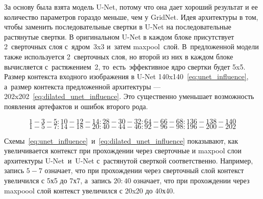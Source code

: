За основу была взята модель U-Net, потому что она дает хороший результат и ее количество параметров гораздо меньше, чем у GridNet. Идея архитектуры в том, чтобы заменить последовательные свертки в U-Net на последовательные растянутые свертки. В оригинальном U-Net в каждом блоке присутствует 2~сверточных слоя с~ядром~3x3 и~затем maxpool~слой. В~предложенной модели также используется 2~сверточных слоя, но второй из них в каждом блоке вычисляется с~растяжением~2, то~есть~эффективное ядро свертки будет 5x5. Размер контекста входного изображения в U-Net 140x140~\eqref{eq:unet_influence}, а~размер контекста предложенной архитектуры — 202x202~\eqref{eq:dilated_unet_influence}. Это существенно уменьшает возможность появления артефактов и ошибок второго рода.

\begin{equation} 
\label{eq:unet_influence}
1-3-5:10-12-14:28-30-32:64-66-68:136-138-140
\end{equation}
\begin{equation} 
\label{eq:dilated_unet_influence}
1-5-7:14-18-20:40-44-46:92-96-98:196-200-202
\end{equation}

Схемы~\eqref{eq:unet_influence}~и~\eqref{eq:dilated_unet_influence} показывают, как увеличивается контекст при прохождении через сверточные и maxpool слои архитектуры U-Net~и~U-Net с~растянутой сверткой соответственно. Например, запись $5-7$ означает, что при прохождении через сверточный слой контекст увеличился с 5х5 до 7х7, а~запись $20:40$ означает, что при прохождении через maxpoool слой контекст увеличился с 20x20 до 40х40.
